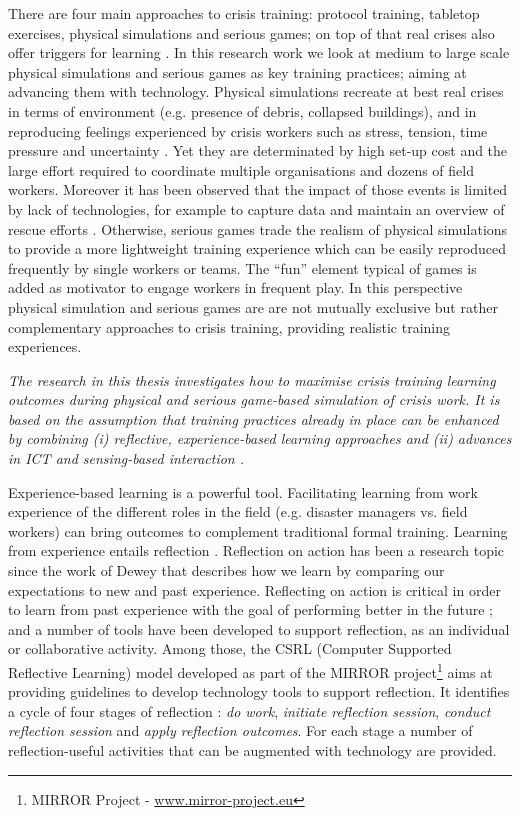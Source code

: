 There are four main approaches to crisis training: protocol training, tabletop exercises, physical simulations and serious games; on top of that real crises also offer triggers for learning \autocite{Deverell:2009fk}. In this research work we look at medium to large scale physical simulations and serious games as key training practices; aiming at advancing them with technology. Physical simulations recreate at best real crises in terms of environment (e.g. presence of debris, collapsed buildings), and in reproducing feelings experienced by crisis workers such as stress, tension, time pressure and uncertainty \autocite{Borodzicz:2002em}. Yet they are determinated by high set-up cost and the large effort required to coordinate multiple organisations and dozens of field workers. Moreover it has been observed that the impact of those events is limited by lack of technologies, for example to capture data and maintain an overview of rescue efforts \autocite{Kyng:2006he}. Otherwise, serious games trade the realism of physical simulations to provide a more lightweight training experience which can be easily reproduced frequently by single workers or teams. The ``fun'' element typical of games is added as motivator to engage workers in frequent play. In this perspective physical simulation and serious games are are not mutually exclusive but rather complementary approaches to crisis training, providing realistic training experiences.

\emph{The research in this thesis investigates how to maximise crisis training learning outcomes during physical and serious game-based simulation of crisis work. It is based on the assumption that training practices already in place can be enhanced by combining (i) reflective, experience-based learning approaches and (ii) advances in ICT and sensing-based interaction \autocite{Zhai:2005jm}.}

Experience-based learning is a powerful tool. Facilitating learning from work experience of the different roles in the field (e.g. disaster managers vs. field workers) can bring outcomes to complement traditional formal training. Learning from experience entails reflection \autocites{boud1985reflection}{Dewey:1998ug}{kolb1974toward}. Reflection on action has been a research topic since the work of Dewey \autocite{dewey1933we} that describes how we learn by comparing our expectations to new and past experience. Reflecting on action is critical in order to learn from past experience with the goal of performing better in the future \autocites{boud1985reflection}{Schon:1983ut}; and a number of tools have been developed to support reflection, as an individual or collaborative activity. Among those, the CSRL (Computer Supported Reflective Learning) model developed as part of the MIRROR project\footnote{MIRROR Project - \url{www.mirror-project.eu}} aims at providing guidelines to develop technology tools to support reflection. It identifies a cycle of four stages of reflection \autocite{Krogstie:2013kf}: \emph{do work}, \emph{initiate reflection session}, \emph{conduct reflection session} and \emph{apply reflection outcomes}. For each stage a number of reflection-useful activities that can be augmented with technology are provided.

